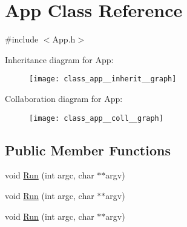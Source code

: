 \hypertarget{class_app}{\section{App Class Reference}
\label{class_app}
}


{\ttfamily \#include $<$App.\+h$>$}



Inheritance diagram for App\+:\nopagebreak
\begin{figure}[H]
\begin{center}
\leavevmode
\texttt{[image: class\_app\_\_inherit\_\_graph]}
\end{center}
\end{figure}


Collaboration diagram for App\+:\nopagebreak
\begin{figure}[H]
\begin{center}
\leavevmode
\texttt{[image: class\_app\_\_coll\_\_graph]}
\end{center}
\end{figure}
\subsection*{Public Member Functions}
\begin{DoxyCompactItemize}
\item 
void \hyperlink{class_app_a92c5c3d8799fe937ea0179b4efb1f4d3}{Run} (int argc, char $\ast$$\ast$argv)
\item 
void \hyperlink{class_app_a92c5c3d8799fe937ea0179b4efb1f4d3}{Run} (int argc, char $\ast$$\ast$argv)
\item 
void \hyperlink{class_app_a92c5c3d8799fe937ea0179b4efb1f4d3}{Run} (int argc, char $\ast$$\ast$argv)
\end{DoxyCompactItemize}
